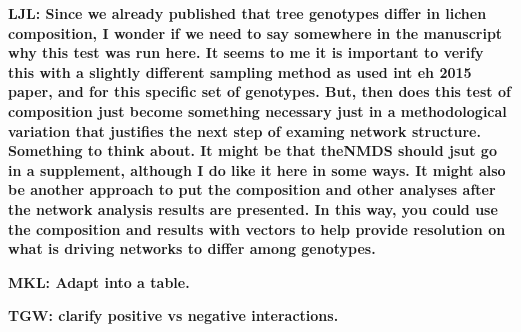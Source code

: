\documentclass[9pt,twocolumn,twoside,lineno]{pnas-new}
\begin{document}
{\textbf{LJL: Since we already published that tree genotypes differ in
  lichen composition, I wonder if we need to say somewhere in the
  manuscript why this test was run here. It seems to me it is
  important to verify this with a slightly different sampling method
  as used int eh 2015 paper, and for this specific set of
  genotypes. But, then does this test of composition just become
  something necessary just in a methodological variation that
  justifies the next step of examing network structure.  Something to
  think about. It might be that theNMDS should jsut go in a
  supplement, although I do like it here in some ways.  It might also
  be another approach to put the composition and other analyses after
  the network analysis results are presented. In this way, you could
  use the composition and results with vectors to help provide
  resolution on what is driving networks to differ among genotypes.}


\textbf{MKL: Adapt into a table.}


\textbf{TGW: clarify positive vs negative interactions.}

}
\end{document}
